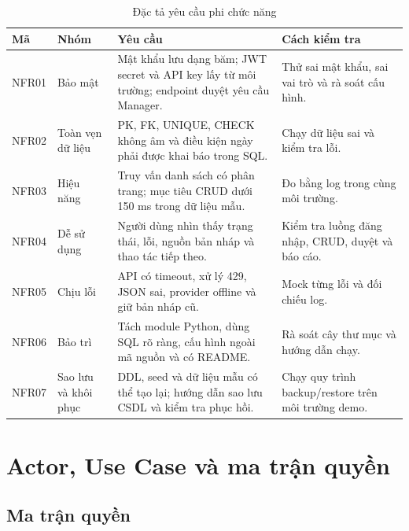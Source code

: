 \begin{table}[h!]
\centering
\small
\caption{Đặc tả yêu cầu phi chức năng}
\begin{tabularx}{\textwidth}{|C{1.0cm}|L{3.1cm}|Y|L{3.1cm}|}
\hline
\textbf{Mã} & \textbf{Nhóm} & \textbf{Yêu cầu} & \textbf{Cách kiểm tra}\\\hline
NFR01 & Bảo mật & Mật khẩu lưu dạng băm; JWT secret và API key lấy từ môi trường; endpoint duyệt yêu cầu Manager. & Thử sai mật khẩu, sai vai trò và rà soát cấu hình.\\\hline
NFR02 & Toàn vẹn dữ liệu & PK, FK, UNIQUE, CHECK không âm và điều kiện ngày phải được khai báo trong SQL. & Chạy dữ liệu sai và kiểm tra lỗi.\\\hline
NFR03 & Hiệu năng & Truy vấn danh sách có phân trang; mục tiêu CRUD dưới 150 ms trong dữ liệu mẫu. & Đo bằng log trong cùng môi trường.\\\hline
NFR04 & Dễ sử dụng & Người dùng nhìn thấy trạng thái, lỗi, nguồn bản nháp và thao tác tiếp theo. & Kiểm tra luồng đăng nhập, CRUD, duyệt và báo cáo.\\\hline
NFR05 & Chịu lỗi & API có timeout, xử lý 429, JSON sai, provider offline và giữ bản nháp cũ. & Mock từng lỗi và đối chiếu log.\\\hline
NFR06 & Bảo trì & Tách module Python, dùng SQL rõ ràng, cấu hình ngoài mã nguồn và có README. & Rà soát cây thư mục và hướng dẫn chạy.\\\hline
NFR07 & Sao lưu và khôi phục & DDL, seed và dữ liệu mẫu có thể tạo lại; hướng dẫn sao lưu CSDL và kiểm tra phục hồi. & Chạy quy trình backup/restore trên môi trường demo.\\\hline
\end{tabularx}
\end{table}

\section{Actor, Use Case và ma trận quyền}

\subsection{Ma trận quyền}

